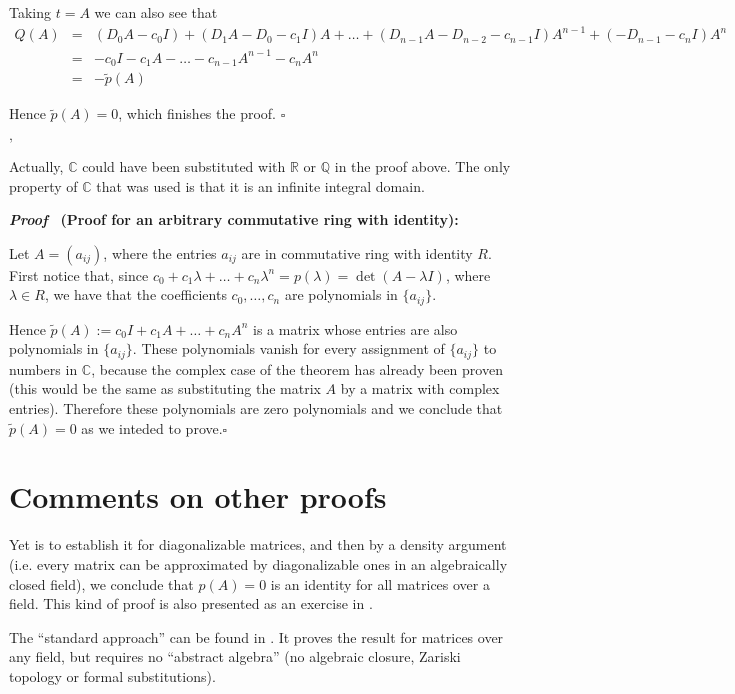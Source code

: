 \documentclass[12pt]{article}
\newcommand{\complex}{\mathbb{C}}
\newcommand{\real}{\mathbb{R}}
\newcommand{\rat}{\mathbb{Q}}
\begin{document}
Taking $t = A$ we can also see that
\begin{eqnarray*}
Q(A) & = & (D_0A - c_0I)+ (D_1A-D_0-c_1I)A + \dots + (D_{n-1}A- D_{n-2} - c_{n-1}I)A^{n-1}+(-D_{n-1} - c_nI)A^n\\
& = & -c_0I - c_1A - \dots - c_{n-1}A^{n-1} - c_nA^n\\
& = &  - \widetilde{p}(A)
\end{eqnarray*}

Hence $\widetilde{p}(A) = 0$, which finishes the proof. $\square$

$,$

Actually, $\complex$ could have been substituted with $\real$ or $\rat$ in the proof above.
The only property of $\complex$ that was used is that it is an infinite integral domain.

{\bf \emph{Proof} $\,$ (Proof for an arbitrary commutative ring with identity):}

Let $A = (a_{ij})$, where the entries $a_{ij}$ are in commutative ring with identity $R$. First notice that, since $c_0+c_1\lambda+\dots + c_n \lambda^n = p(\lambda)= \det(A - \lambda I)$, where $\lambda \in R$, we have that the coefficients $c_0, \dots, c_n$ are polynomials in $\{a_{ij}\}$.

Hence $\widetilde{p}(A):= c_0I + c_1A+ \dots +c_nA^n$ is a matrix whose entries are also polynomials in $\{ a_{ij} \}$.
These polynomials vanish for every assignment of $\{ a_{ij} \}$ to numbers in $\mathbb{C}$,
because the complex case of the theorem has already been proven (this would be the same as substituting the matrix $A$ by a matrix with complex entries).
Therefore these polynomials are zero polynomials and we conclude that $\widetilde{p}(A) = 0$ as we inteded to prove.$\square$

\section*{Comments on other proofs}

Yet 
is to establish it for diagonalizable matrices,
and then by a density argument (i.e. every matrix can be approximated by
diagonalizable ones in an algebraically closed field), 
we conclude that $p(A) = 0$ is an identity for all matrices over a field.
This kind of proof is also presented as an exercise in \cite{Artin}.

The ``standard approach'' can be found in \cite{Friedberg}.
It proves the result for matrices over any field,
but requires no ``abstract algebra'' (no algebraic closure, Zariski topology or formal substitutions).
\end{document}
